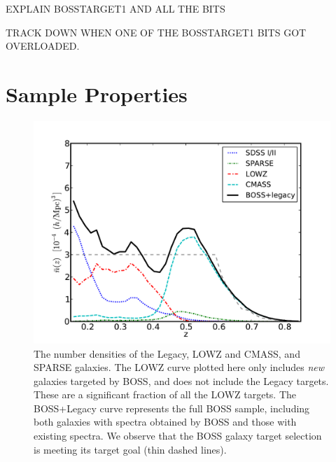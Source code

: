 \documentclass[preprint]{aastex}
\begin{document}
EXPLAIN BOSSTARGET1 AND ALL THE BITS

TRACK DOWN WHEN ONE OF THE BOSSTARGET1 BITS GOT OVERLOADED.

\section{Sample Properties}

\begin{figure}
\includegraphics[width=0.95\columnwidth]{plots/nbarz-40-chunk6-21-CMASS_LOWZ_SPARSE}
\caption{The number densities of the Legacy, LOWZ and CMASS, and SPARSE 
galaxies. The LOWZ curve plotted here only includes {\it new} galaxies targeted
by BOSS, and does not include the Legacy targets. These are a
significant fraction of all the LOWZ targets. The BOSS+Legacy curve represents
the full BOSS sample, including both galaxies with spectra obtained by BOSS and
those with existing spectra. We observe that the BOSS galaxy target selection is
meeting its target goal (thin dashed lines).}
\label{fig:nbar}
\end{figure}
\end{document}
